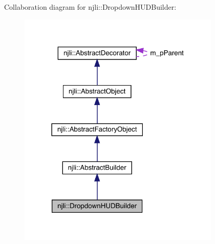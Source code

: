 Collaboration diagram for njli\+:\+:Dropdown\+H\+U\+D\+Builder\+:\nopagebreak
\begin{figure}[H]
\begin{center}
\leavevmode
\includegraphics[width=273pt]{classnjli_1_1_dropdown_h_u_d_builder__coll__graph}
\end{center}
\end{figure}
